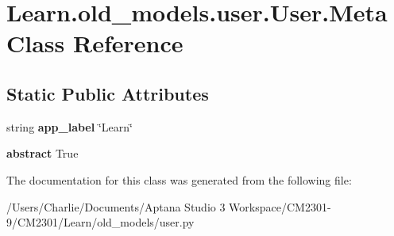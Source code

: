 \hypertarget{class_learn_1_1old__models_1_1user_1_1_user_1_1_meta}{\section{Learn.\-old\-\_\-models.\-user.\-User.\-Meta Class Reference}
\label{class_learn_1_1old__models_1_1user_1_1_user_1_1_meta}
}
\subsection*{Static Public Attributes}
\begin{DoxyCompactItemize}
\item 
\hypertarget{class_learn_1_1old__models_1_1user_1_1_user_1_1_meta_ac2af85f358931aa70076ec75a6e99e02}{string {\bfseries app\-\_\-label} \char`\"{}Learn\char`\"{}}\label{class_learn_1_1old__models_1_1user_1_1_user_1_1_meta_ac2af85f358931aa70076ec75a6e99e02}

\item 
\hypertarget{class_learn_1_1old__models_1_1user_1_1_user_1_1_meta_a293506bbccbb0669dbdfff32e18b5c7a}{{\bfseries abstract} True}\label{class_learn_1_1old__models_1_1user_1_1_user_1_1_meta_a293506bbccbb0669dbdfff32e18b5c7a}

\end{DoxyCompactItemize}


The documentation for this class was generated from the following file\-:\begin{DoxyCompactItemize}
\item 
/\-Users/\-Charlie/\-Documents/\-Aptana Studio 3 Workspace/\-C\-M2301-\/9/\-C\-M2301/\-Learn/old\-\_\-models/user.\-py\end{DoxyCompactItemize}
